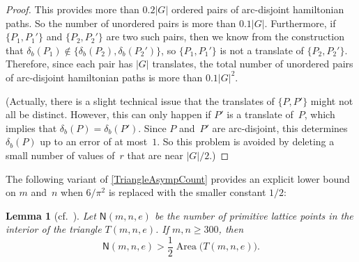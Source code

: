 \documentclass[11pt]{amsart}
\newtheorem{lem}[equation]{Lemma}
\theoremstyle{definition}
\numberwithin{case}{startcases}
\numberwithin{equation}{section}
\DeclareMathOperator{\Area}{Area}
\begin{document}
\begin{proof}
		This provides more than $0.2 |G|$ ordered pairs of arc-disjoint hamiltonian paths. So the number of unordered pairs is more than $0.1 |G|$. Furthermore, if $\{P_1, P_1'\}$ and $\{P_2, P_2'\}$ are two such pairs, then we know from the construction that $\delta_b(P_1) \notin \{\delta_b(P_2), \delta_b(P_2')\}$, so $\{P_1, P_1'\}$ is not a translate of $\{P_2, P_2'\}$. Therefore, since each pair has $|G|$ translates, the total number of unordered pairs of arc-disjoint hamiltonian paths is more than $0.1 |G|^2$.
		
		(Actually, there is a slight technical issue that the translates of $\{P, P'\}$ might not all be distinct. However, this can only happen if $P'$ is a translate of~$P$, which implies that $\delta_b(P) = \delta_b(P')$. Since $P$ and~$P'$ are arc-disjoint, this determines $\delta_b(P)$ up to an error of at most~$1$. So this problem is avoided by deleting a small number of values of~$r$ that are near $|G|/2$.)
	\end{proof}
	
	The following variant of \cref{TriangleAsympCount} provides an explicit lower bound on $m$ and~$n$ when $6/\pi^2$ is replaced with the smaller constant $1/2$:
	
	\begin{lem}[cf.\ {\cite[Thm.~8.5]{Curran}}] \label{TriangleCount}
		Let\/ $\mathsf N(m,n,e)$ be the number of primitive lattice points in the interior of the triangle $T(m,n,e)$.
		If $m,n \ge 300$, then 
		\[ \mathsf N(m,n,e) > \frac{1}{2} \Area \bigl( T(m,n,e) \bigr) . \]
	\end{lem}
	
\end{document}
